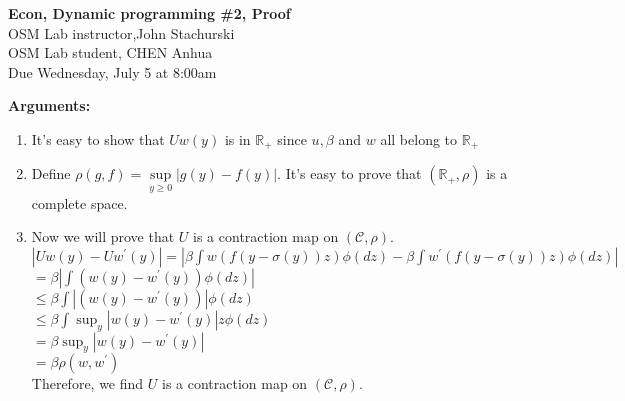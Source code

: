 \documentclass[letterpaper,12pt]{article}
\theoremstyle{definition}
\begin{document}
\begin{flushleft}
   \textbf{\large{Econ, Dynamic programming \#2, Proof}} \\[5pt]
   OSM Lab instructor,John Stachurski \\[5pt]
   OSM Lab student, CHEN Anhua\\[5pt]
   Due Wednesday, July 5 at 8:00am
\end{flushleft}

\vspace{5mm}

\textbf{Arguments:}
\begin{enumerate}
	\item It's easy to show that $Uw(y)$ is in $\mathbb{R_+}$ since $u, \beta$ and $w$ all belong to $\mathbb{R_+}$\\

	\item Define $\rho(g, f) =\sup \limits_{y \geq 0} |g(y) - f(y)|$. It's easy to prove that $(\mathbb{R_+}, \rho)$ is a complete space.\\

	\item Now we will prove that $U$ is a contraction map on $(\mathcal{C}, \rho)$. \\
	$|Uw(y) - Uw^{'}(y)| =| \beta \int w(f(y - \sigma (y))z)\phi(dz) - \beta \int w^{'}(f(y - \sigma (y))z)\phi(dz)|$\\
	                                   $= \beta|\int (w(y) - w^{'}(y))\phi(dz)|$\\
				   $\leq  \beta\int |(w(y) - w^{'}(y))|\phi(dz) $\\
				   $\leq \beta \int \sup_{y}|w(y) - w^{'}(y)|z\phi(dz)$\\
				   $= \beta \sup_{y}|w(y) - w^{'}(y)|$\\
				   $= \beta \rho(w, w^{'})$\\
	Therefore, we find $U$ is a contraction map on $(\mathcal{C}, \rho)$.

	
\end{enumerate}

\vspace{25mm}
\end{document}
